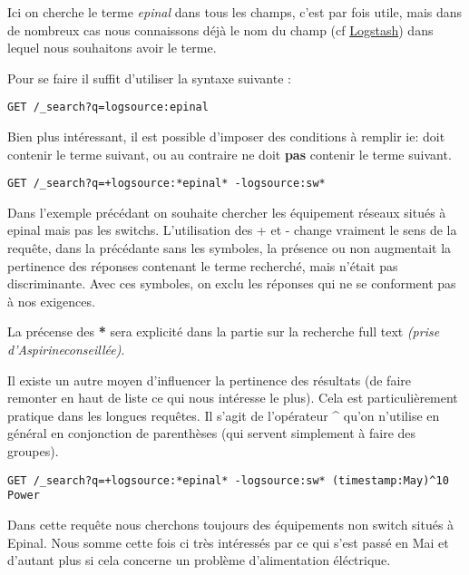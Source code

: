 Ici on cherche le terme \emph{epinal} dans tous les champs, c'est par fois utile,
mais dans de nombreux cas nous connaissons déjà le nom du champ (cf \hyperref[lst:grokregex1]{Logstash}) dans
lequel nous souhaitons avoir le terme. 

Pour se faire il suffit d'utiliser la syntaxe suivante : 
\begin{lstlisting}[style=code,label={lst:APIsearchliteexample2},caption={Choix du champ}]
GET /_search?q=logsource:epinal
\end{lstlisting}

Bien plus intéressant, il est possible d'imposer des conditions à remplir ie: doit
contenir le terme suivant, ou au contraire ne doit \textbf{pas} contenir le terme 
suivant.

\begin{lstlisting}[style=code,label={lst:APIsearchliteexample3},caption={Conditions must (not) match}]
GET /_search?q=+logsource:*epinal* -logsource:sw*
\end{lstlisting}

Dans l'exemple précédant on souhaite chercher les équipement réseaux situés à epinal
mais pas les switchs.
L'utilisation des + et - change vraiment le sens de la requête, dans la précédante
sans les symboles, la présence ou non augmentait la pertinence des réponses contenant
le terme recherché, mais n'était pas discriminante.
Avec ces symboles, on exclu les réponses qui ne se conforment pas à nos exigences.


La précense des \textbf{*} sera explicité dans la partie sur la recherche full text
{\scriptsize \textit{(prise d'Aspirine\texttrademark conseillée)}}.


Il existe un autre moyen d'influencer la pertinence des résultats (de faire remonter
en haut de liste ce qui nous intéresse le plus).
Cela est particulièrement pratique dans les longues requêtes.
Il s'agit de l'opérateur \textbf{\^} qu'on n'utilise en général en conjonction de
parenthèses (qui servent simplement à faire des groupes).


\begin{lstlisting}[style=code,label={lst:APIsearchliteexample4},caption={Modifier la pertinence}]
GET /_search?q=+logsource:*epinal* -logsource:sw* (timestamp:May)^10 Power
\end{lstlisting}
Dans cette requête nous cherchons toujours des équipements non switch situés à Epinal.
Nous somme cette fois ci très intéressés par ce qui s'est passé en Mai et d'autant
plus si cela concerne un problème d'alimentation éléctrique.


